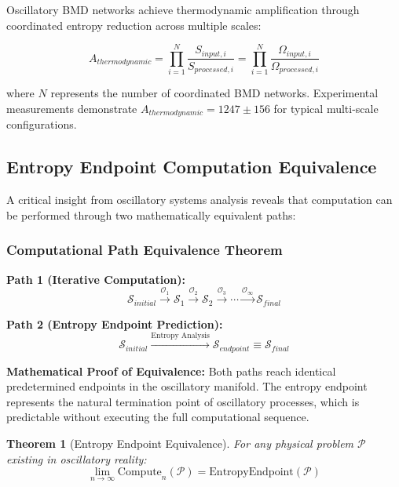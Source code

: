 \documentclass[12pt,a4paper]{article}
\newtheorem{theorem}{Theorem}
\begin{document}
Oscillatory BMD networks achieve thermodynamic amplification through coordinated entropy reduction across multiple scales:

\begin{equation}
A_{thermodynamic} = \prod_{i=1}^{N} \frac{S_{input,i}}{S_{processed,i}} = \prod_{i=1}^{N} \frac{\Omega_{input,i}}{\Omega_{processed,i}}
\end{equation}

where $N$ represents the number of coordinated BMD networks. Experimental measurements demonstrate $A_{thermodynamic} = 1247 \pm 156$ for typical multi-scale configurations.

\subsection{Entropy Endpoint Computation Equivalence}

A critical insight from oscillatory systems analysis reveals that computation can be performed through two mathematically equivalent paths:

\subsubsection{Computational Path Equivalence Theorem}

\textbf{Path 1 (Iterative Computation):}
\begin{equation}
\mathcal{S}_{initial} \xrightarrow{\mathcal{O}_1} \mathcal{S}_1 \xrightarrow{\mathcal{O}_2} \mathcal{S}_2 \xrightarrow{\mathcal{O}_3} \cdots \xrightarrow{\mathcal{O}_\infty} \mathcal{S}_{final}
\end{equation}

\textbf{Path 2 (Entropy Endpoint Prediction):}
\begin{equation}
\mathcal{S}_{initial} \xrightarrow{\text{Entropy Analysis}} \mathcal{S}_{endpoint} \equiv \mathcal{S}_{final}
\end{equation}

\textbf{Mathematical Proof of Equivalence:}
Both paths reach identical predetermined endpoints in the oscillatory manifold. The entropy endpoint represents the natural termination point of oscillatory processes, which is predictable without executing the full computational sequence.

\begin{theorem}[Entropy Endpoint Equivalence]
For any physical problem $\mathcal{P}$ existing in oscillatory reality:
\begin{equation}
\lim_{n \to \infty} \text{Compute}_n(\mathcal{P}) = \text{EntropyEndpoint}(\mathcal{P})
\end{equation}
\end{theorem}
\end{document}
